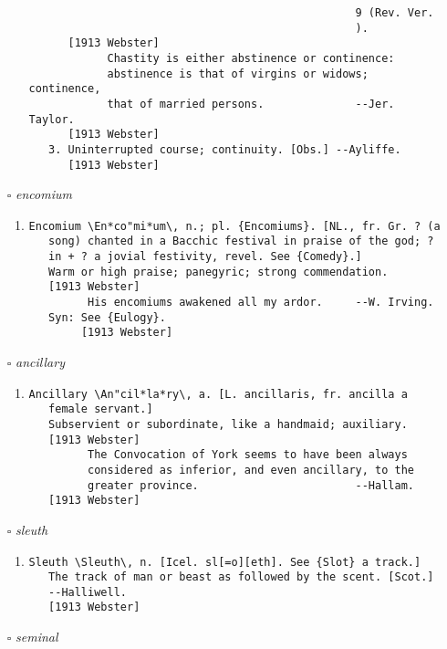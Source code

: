 \documentclass{article}
\begin{document}
\begin{itemize}
\begin{enumerate}
{\begin{lstlisting}
                                                  9 (Rev. Ver.
                                                  ).
      [1913 Webster]
            Chastity is either abstinence or continence:
            abstinence is that of virgins or widows; continence,
            that of married persons.              --Jer. Taylor.
      [1913 Webster]
   3. Uninterrupted course; continuity. [Obs.] --Ayliffe.
      [1913 Webster]
\end{lstlisting}}
\end{enumerate}
\item[$\square$] \emph{ encomium }
\begin{enumerate}
\item{
\begin{lstlisting}
Encomium \En*co"mi*um\, n.; pl. {Encomiums}. [NL., fr. Gr. ? (a
   song) chanted in a Bacchic festival in praise of the god; ?
   in + ? a jovial festivity, revel. See {Comedy}.]
   Warm or high praise; panegyric; strong commendation.
   [1913 Webster]
         His encomiums awakened all my ardor.     --W. Irving.
   Syn: See {Eulogy}.
        [1913 Webster]
\end{lstlisting}}
\end{enumerate}
\item[$\square$] \emph{ ancillary }
\begin{enumerate}
\item{
\begin{lstlisting}
Ancillary \An"cil*la*ry\, a. [L. ancillaris, fr. ancilla a
   female servant.]
   Subservient or subordinate, like a handmaid; auxiliary.
   [1913 Webster]
         The Convocation of York seems to have been always
         considered as inferior, and even ancillary, to the
         greater province.                        --Hallam.
   [1913 Webster]
\end{lstlisting}}
\end{enumerate}
\item[$\square$] \emph{ sleuth }
\begin{enumerate}
\item{
\begin{lstlisting}
Sleuth \Sleuth\, n. [Icel. sl[=o][eth]. See {Slot} a track.]
   The track of man or beast as followed by the scent. [Scot.]
   --Halliwell.
   [1913 Webster]
\end{lstlisting}}
\end{enumerate}
\item[$\square$] \emph{ seminal }
\begin{enumerate}

\end{enumerate}
\end{itemize}
\end{document}
